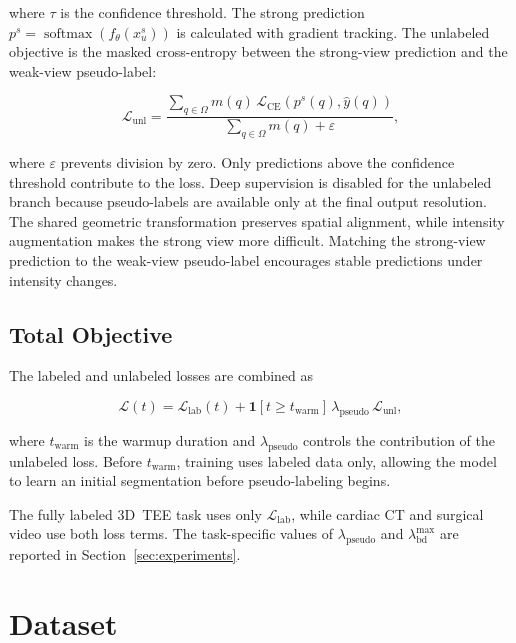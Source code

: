 \documentclass[runningheads]{llncs}
\begin{document}
where $\tau$ is the confidence threshold. The strong prediction
$p^s=\operatorname{softmax}(f_\theta(x_u^s))$ is calculated with
gradient tracking. The unlabeled objective is the masked cross-entropy
between the strong-view prediction and the weak-view pseudo-label:

\begin{equation}
\mathcal{L}_{\mathrm{unl}}
=
\frac{
\sum_{q\in\Omega}
m(q)\,
\mathcal{L}_{\mathrm{CE}}
\left(p^s(q),\hat{y}(q)\right)
}{
\sum_{q\in\Omega}m(q)+\varepsilon
},
\end{equation}

where $\varepsilon$ prevents division by zero. Only predictions above
the confidence threshold contribute to the loss. Deep supervision is
disabled for the unlabeled branch because pseudo-labels are available
only at the final output resolution. The shared geometric
transformation preserves spatial alignment, while intensity
augmentation makes the strong view more difficult. Matching the
strong-view prediction to the weak-view pseudo-label encourages stable
predictions under intensity changes.

\subsection{Total Objective}

The labeled and unlabeled losses are combined as

\begin{equation}
\mathcal{L}(t)
=
\mathcal{L}_{\mathrm{lab}}(t)
+
\mathbf{1}[t\geq t_{\mathrm{warm}}]\,
\lambda_{\mathrm{pseudo}}\,
\mathcal{L}_{\mathrm{unl}},
\end{equation}

where $t_{\mathrm{warm}}$ is the warmup duration and
$\lambda_{\mathrm{pseudo}}$ controls the contribution of the unlabeled
loss. Before $t_{\mathrm{warm}}$, training uses labeled data only,
allowing the model to learn an initial segmentation before
pseudo-labeling begins.

The fully labeled 3D~TEE task uses only
$\mathcal{L}_{\mathrm{lab}}$, while cardiac CT and surgical video use
both loss terms. The task-specific values of
$\lambda_{\mathrm{pseudo}}$ and $\lambda_{\mathrm{bd}}^{\max}$ are
reported in Section~\ref{sec:experiments}.

\section{Dataset}
\label{sec:data}
\end{document}
